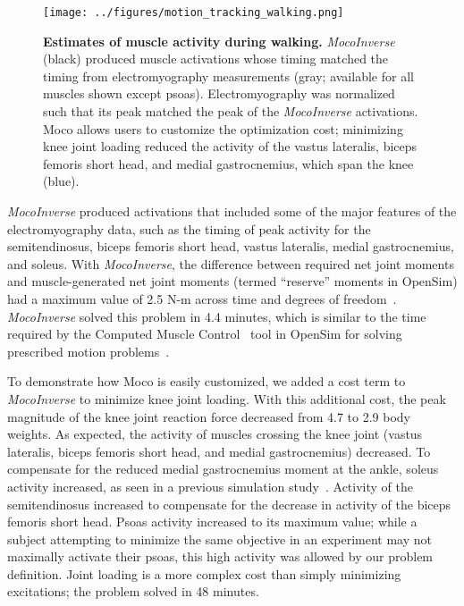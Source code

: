 \documentclass[10pt,letterpaper]{article}
\begin{document}
\begin{figure}[!h]
        \begin{adjustwidth}{-2.25in}{0in} %
    \centering
    \texttt{[image: ../figures/motion\_tracking\_walking.png]}
    \caption{{\bf Estimates of muscle activity during walking.}
    \textit{MocoInverse} (black) produced muscle activations whose timing matched the timing from electromyography measurements (gray; available for all muscles shown except psoas). Electromyography was normalized such that its peak matched the peak of the \textit{MocoInverse} activations. Moco allows users to customize the optimization cost; minimizing knee joint loading reduced the activity of the vastus lateralis, biceps femoris short head, and medial gastrocnemius, which span the knee (blue).
    }
    \label{walking}
        \end{adjustwidth}
\end{figure}

\textit{MocoInverse} produced activations that included some of the major features of the electromyography data, such as the timing of peak activity for the semitendinosus, biceps femoris short head, vastus lateralis, medial gastrocnemius, and soleus. With \textit{MocoInverse}, the difference between required net joint moments and muscle-generated net joint moments (termed “reserve” moments in OpenSim) had a maximum value of 2.5 N-m across time and degrees of freedom~\cite{Hicks:2015bo}. \textit{MocoInverse} solved this problem in 4.4 minutes, which is similar to the time required by the Computed Muscle Control~\cite{Thelen:2003bba} tool in OpenSim for solving prescribed motion problems~\cite{Rajagopal:2016ek}.

To demonstrate how Moco is easily customized, we added a cost term to \textit{MocoInverse} to minimize knee joint loading. With this additional cost, the peak magnitude of the knee joint reaction force decreased from 4.7 to 2.9 body weights. As expected, the activity of muscles crossing the knee joint (vastus lateralis, biceps femoris short head, and medial gastrocnemius) decreased. To compensate for the reduced medial gastrocnemius moment at the ankle, soleus activity increased, as seen in a previous simulation study~\cite{DeMers:2014}. Activity of the semitendinosus increased to compensate for the decrease in activity of the biceps femoris short head. Psoas activity increased to its maximum value; while a subject attempting to minimize the same objective in an experiment may not maximally activate their psoas, this high activity was allowed by our problem definition. Joint loading is a more complex cost than simply minimizing excitations; the problem solved in 48 minutes.
\end{document}
